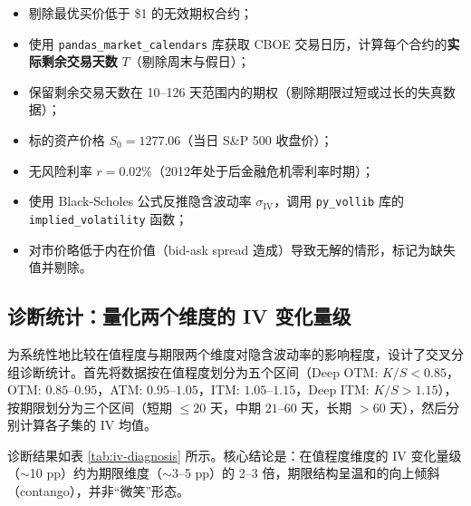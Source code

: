 \begin{itemize}
    \item 剔除最优买价低于 \$1 的无效期权合约；
    \item 使用 \texttt{pandas\_market\_calendars} 库获取 CBOE 交易日历，计算每个合约的\textbf{实际剩余交易天数} $T$（剔除周末与假日）；
    \item 保留剩余交易天数在 10--126 天范围内的期权（剔除期限过短或过长的失真数据）；
    \item 标的资产价格 $S_0 = 1277.06$（当日 S\&P 500 收盘价）；
    \item 无风险利率 $r = 0.02\%$（2012年处于后金融危机零利率时期）；
    \item 使用 Black-Scholes 公式反推隐含波动率 $\sigma_{\text{IV}}$，调用 \texttt{py\_vollib} 库的 \texttt{implied\_volatility} 函数；
    \item 对市价略低于内在价值（bid-ask spread 造成）导致无解的情形，标记为缺失值并剔除。
\end{itemize}

\subsection{诊断统计：量化两个维度的 IV 变化量级}

为系统性地比较在值程度与期限两个维度对隐含波动率的影响程度，设计了交叉分组诊断统计。首先将数据按在值程度划分为五个区间（Deep OTM: $K/S < 0.85$，OTM: $0.85$--$0.95$，ATM: $0.95$--$1.05$，ITM: $1.05$--$1.15$，Deep ITM: $K/S > 1.15$），按期限划分为三个区间（短期 $\leq 20$ 天，中期 $21$--$60$ 天，长期 $> 60$ 天），然后分别计算各子集的 IV 均值。

诊断结果如表 \ref{tab:iv-diagnosis} 所示。核心结论是：在值程度维度的 IV 变化量级（$\sim$10 pp）约为期限维度（$\sim$3--5 pp）的 2--3 倍，期限结构呈温和的向上倾斜（contango），并非“微笑”形态。


